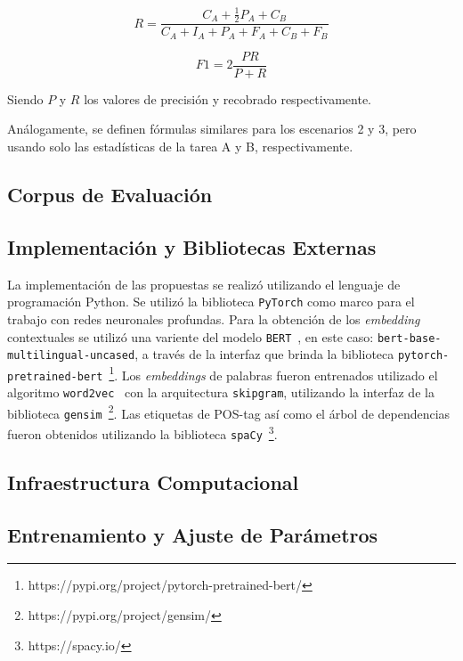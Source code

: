 \begin{equation*}
R = \frac{C_A + \frac{1}{2}P_A + C_B}{C_A + I_A + P_A + F_A + C_B + F_B}
\end{equation*}

\begin{equation*}
F1 = 2\frac{PR}{P+R}
\end{equation*}

Siendo $P$ y $R$ los valores de precisión y recobrado respectivamente.

Análogamente, se definen fórmulas similares para los escenarios 2 y 3, pero usando solo las estadísticas de la tarea A y B, respectivamente.

\subsection{Corpus de Evaluación}


\subsection{Implementación y Bibliotecas Externas}

La implementación de las propuestas se realizó utilizando el lenguaje de programación Python.
Se utilizó la biblioteca \texttt{PyTorch} como marco para el trabajo con redes neuronales profundas.
Para la obtención de los \textit{embedding} contextuales se utilizó una variente del modelo \texttt{BERT}~\cite{devlin2018bert}, en este caso: \texttt{bert-base-multilingual-uncased}, a través de la interfaz que brinda la biblioteca \texttt{pytorch-pretrained-bert}~\footnote{https://pypi.org/project/pytorch-pretrained-bert/}.
Los \textit{embeddings} de palabras fueron entrenados utilizado el algoritmo \texttt{word2vec}~\cite{mikolov2013efficient} con la arquitectura \texttt{skipgram}, utilizando la interfaz de la biblioteca \texttt{gensim}~\footnote{https://pypi.org/project/gensim/}.
Las etiquetas de POS-tag así como el árbol de dependencias fueron obtenidos utilizando la biblioteca \texttt{spaCy}~\footnote{https://spacy.io/}.

\subsection{Infraestructura Computacional}



\subsection{Entrenamiento y Ajuste de Parámetros}\label{sec:training}

